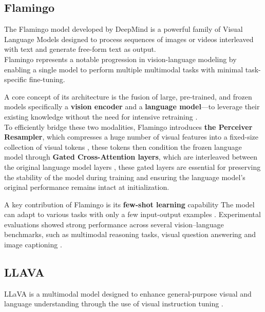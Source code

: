 \documentclass[12pt,a4paper,oneside,english]{book}
\begin{document}
\subsection{Flamingo }%
\label{subsec:flamingo}
The Flamingo model developed by DeepMind is a powerful family of Visual Language Models designed to process sequences of images or videos
interleaved with text and generate free-form text as output. \\
Flamingo represents a notable progression in vision-language modeling by enabling a single model to perform multiple multimodal tasks with minimal task-specific fine-tuning.

A core concept of its architecture is the fusion of large, pre-trained, and frozen models specifically a \textbf{vision encoder} and a \textbf{language model}—to leverage their existing knowledge without the need for intensive retraining . \\To efficiently bridge these two modalities, Flamingo introduces \textbf{the Perceiver Resampler}, which compresses a huge number of visual features into a fixed-size collection of visual tokens , these tokens then condition the frozen language model through \textbf{Gated Cross-Attention layers}, which are interleaved between the original language model layers , these gated layers are essential for preserving the stability of the model during training and ensuring the language model's original performance remains intact at initialization.

A key contribution of Flamingo is its \textbf{few-shot learning} capability The model can adapt to various tasks with only a few input-output examples .
Experimental evaluations showed strong performance across several vision–language benchmarks,  such as multimodal reasoning tasks, visual question answering and image captioning \citep{alayrac2022flamingo}.


\subsection{LLAVA}%
LLaVA  is a multimodal model designed to enhance general-purpose visual and language understanding through the use of visual instruction tuning \citep{liu2024llava}.
\end{document}
